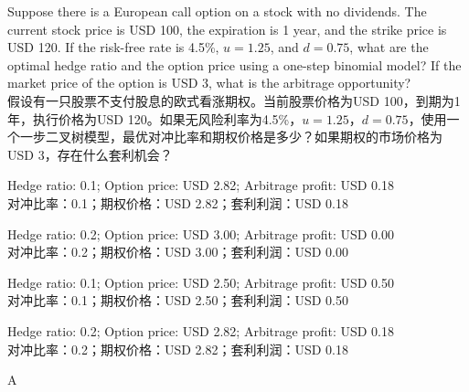 \documentclass{article}
\newcounter{question} %
\begin{document}
\begin{question}
    Suppose there is a European call option on a stock with no dividends. The current stock price is USD 100, the expiration is 1 year, and the strike price is USD 120. If the risk-free rate is 4.5\%, \( u = 1.25 \), and \( d = 0.75 \), what are the optimal hedge ratio and the option price using a one-step binomial model? If the market price of the option is USD 3, what is the arbitrage opportunity?
    \\假设有一只股票不支付股息的欧式看涨期权。当前股票价格为USD 100，到期为1年，执行价格为USD 120。如果无风险利率为4.5\%，\( u = 1.25 \)，\( d = 0.75 \)，使用一个一步二叉树模型，最优对冲比率和期权价格是多少？如果期权的市场价格为USD 3，存在什么套利机会？
    \end{question}
    
    \begin{choices}
    \item Hedge ratio: 0.1; Option price: USD 2.82; Arbitrage profit: USD 0.18\\
    对冲比率：0.1；期权价格：USD 2.82；套利利润：USD 0.18
    \item Hedge ratio: 0.2; Option price: USD 3.00; Arbitrage profit: USD 0.00\\
    对冲比率：0.2；期权价格：USD 3.00；套利利润：USD 0.00
    \item Hedge ratio: 0.1; Option price: USD 2.50; Arbitrage profit: USD 0.50\\
    对冲比率：0.1；期权价格：USD 2.50；套利利润：USD 0.50
    \item Hedge ratio: 0.2; Option price: USD 2.82; Arbitrage profit: USD 0.18\\
    对冲比率：0.2；期权价格：USD 2.82；套利利润：USD 0.18
    \end{choices}
    
    \begin{correctanswer}
    A
    \end{correctanswer}
    
\end{document}
